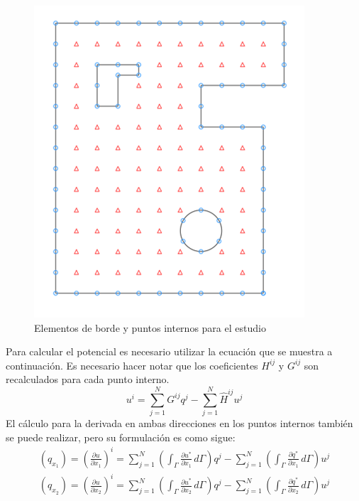 \documentclass[11pt]{article}
\begin{document}
\begin{figure}[H]
\centering
\includegraphics[scale=1]{Imagenes/bem.png}
\caption{Elementos de borde y puntos internos para el estudio}\label{fig:Puntos internos de BEM}
\end{figure}
Para calcular el potencial es necesario utilizar la ecuación que se muestra a continuación. Es necesario hacer notar que los coeficientes $H^{ij}$ y $G^{ij}$ son recalculados para cada punto interno. 
\begin{equation}
\label{eq:Calculo puntos internos discretizada}
u^i=\sum_{j=1}^NG^{ij}q^j-\sum_{j=1}^N\hat{H}^{ij}u^j
\end{equation}
El cálculo para la derivada en ambas direcciones en los puntos internos también se puede realizar, pero su formulación es como sigue:
\begin{equation}
\label{eq:Calculo derivada en puntos internos}
\begin{split}
\left(q_{x_1}\right)=\left(\frac{\partial u}{\partial x_1}\right)^i=\sum_{j=1}^N\left(\int_\Gamma \frac{\partial u^*}{\partial x_1}\,d\Gamma\right)q^j-\sum_{j=1}^N\left(\int_\Gamma \frac{\partial q^*}{\partial x_1}\,d\Gamma\right)u^j\\
\left(q_{x_2}\right)=\left(\frac{\partial u}{\partial x_2}\right)^i=\sum_{j=1}^N\left(\int_\Gamma \frac{\partial u^*}{\partial x_2}\,d\Gamma\right)q^j-\sum_{j=1}^N\left(\int_\Gamma \frac{\partial q^*}{\partial x_2}\,d\Gamma\right)u^j\\
\end{split}
\end{equation}
\newpage
\end{document}
